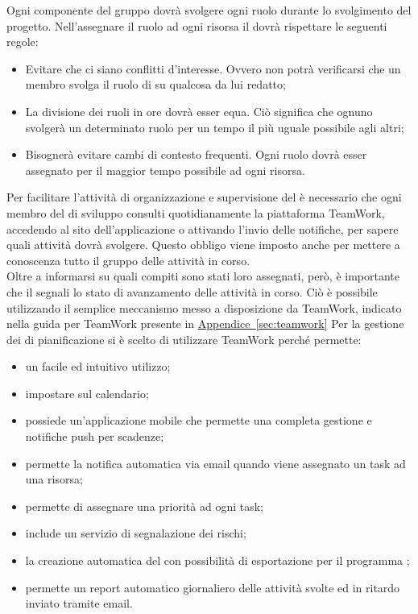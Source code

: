 			Ogni componente del gruppo dovrà svolgere ogni ruolo durante lo svolgimento del progetto. Nell'assegnare il ruolo ad ogni risorsa
			il  dovrà rispettare le seguenti regole:
			\begin{itemize}
				\item Evitare che ci siano conflitti d'interesse. Ovvero non potrà verificarsi che un membro svolga il ruolo di 
				su qualcosa da lui redatto;
				\item La divisione dei ruoli in ore dovrà esser equa. Ciò significa che ognuno svolgerà un determinato ruolo per un tempo il più
				uguale possibile agli altri;
				\item Bisognerà evitare cambi di contesto frequenti. Ogni ruolo dovrà esser assegnato per il maggior tempo possibile ad ogni risorsa.
			\end{itemize}
		 \label{subsec:aggiornamentoStatoTicket}
			Per facilitare l'attività di organizzazione e supervisione del  è necessario che ogni membro del  di sviluppo consulti quotidianamente la piattaforma TeamWork, accedendo al sito dell'applicazione o attivando l'invio delle notifiche, per sapere quali attività dovrà svolgere. Questo obbligo viene imposto anche per mettere a conoscenza tutto il gruppo delle attività in corso.\\
			Oltre a informarsi su quali compiti sono stati loro assegnati, però, è importante che il  segnali lo stato di avanzamento delle attività in corso. Ciò è possibile utilizzando il semplice meccanismo messo a disposizione da TeamWork, indicato nella guida per TeamWork presente in \hyperref[sec:teamwork]{Appendice~\ref*{sec:teamwork}}
			Per la gestione dei  di pianificazione si è scelto di utilizzare TeamWork perché permette:
			\begin{itemize}
				\item un facile ed intuitivo utilizzo;
				\item impostare  sul calendario;
				\item possiede un'applicazione mobile che permette una completa gestione e notifiche push per scadenze;
				\item permette la notifica automatica via email quando viene assegnato un task ad una risorsa;
				\item permette di assegnare una priorità ad ogni task;
				\item include un servizio di segnalazione dei rischi;
				\item la creazione automatica del  con possibilità di esportazione per il programma ;
				\item permette un report automatico giornaliero delle attività svolte ed in ritardo inviato tramite email.
			\end{itemize}
